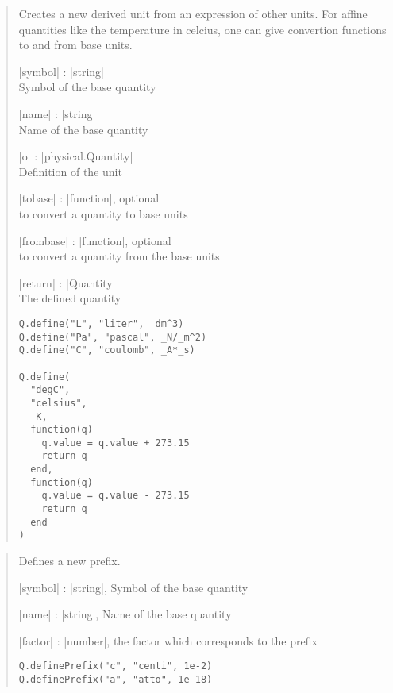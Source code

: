 \documentclass{ltxdoc}
\begin{document}
\begin{quote}
  Creates a new derived unit from an expression of other units. For affine quantities like the temperature in celcius, one can give convertion functions to and from base units.

  \subtitle{Parameters}
  \begin{description}
  \item |symbol| : |string|\\
  Symbol of the base quantity

  \item |name| : |string|\\
    Name of the base quantity

  \item |o| : |physical.Quantity|\\
    Definition of the unit

  \item |tobase| : |function|, optional\\
    to convert a quantity to base units

  \item |frombase| : |function|, optional\\
    to convert a quantity from the base units

  \item |return| : |Quantity|\\
    The defined quantity
  \end{description}

  \subtitle{Examples}
  \begin{lstlisting}
Q.define("L", "liter", _dm^3)
Q.define("Pa", "pascal", _N/_m^2)
Q.define("C", "coulomb", _A*_s)

Q.define(
  "degC", 
  "celsius",
  _K, 
  function(q)
    q.value = q.value + 273.15
    return q
  end,
  function(q)
    q.value = q.value - 273.15
    return q
  end
)
  \end{lstlisting}
\end{quote}






\begin{quote}
  Defines a new prefix.

  \begin{description}
  \item |symbol| : |string|, Symbol of the base quantity

  \item |name| : |string|, Name of the base quantity

  \item |factor| : |number|, the factor which corresponds to the prefix
  \end{description}


\begin{lstlisting}
Q.definePrefix("c", "centi", 1e-2)
Q.definePrefix("a", "atto", 1e-18)
\end{lstlisting}
\end{quote}
\end{document}
